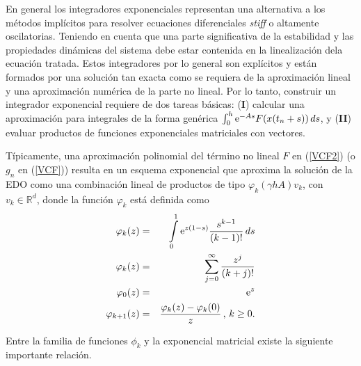 En general los integradores exponenciales representan una alternativa a los métodos implícitos para resolver ecuaciones diferenciales \textit{stiff} o altamente oscilatorias. Teniendo en cuenta que una parte significativa de la estabilidad y las propiedades dinámicas del sistema debe estar contenida en la linealización dela ecuación tratada. Estos integradores por lo general son explícitos y están formados por una solución tan exacta como se requiera de la aproximación lineal y una aproximación numérica de la parte no lineal. Por lo tanto, construir un integrador exponencial requiere de dos tareas básicas: (\textbf{I}) calcular una aproximación para integrales de la forma 
genérica $\int_{0}^{h} \mathrm{e}^{-As}F(x(t_n+s)) \,ds$, y (\textbf{II}) evaluar productos de funciones exponenciales matriciales con vectores.

Típicamente, una aproximación polinomial del término no lineal $F$ en (\ref{VCF2}) (o $g_n$ en (\ref{VCF})) resulta en un esquema
exponencial que aproxima la solución de la EDO como una combinación lineal de productos de tipo $\varphi_k(\gamma hA)v_k$, con 
$v_k\in \mathbb{R}^{d}$, donde la función $\varphi_k$ está definida como
\begin{eqnarray}\label{phi-definition}
    \varphi_k(z) & = &\int\limits_{0}^{1}\mathrm{e}^{z(1-s)}\frac{s^{k-1}}{(k-1)!}\,ds \nonumber \\
    \varphi_k(z) & = &\sum\limits_{j=0}^{\infty}\frac{z^{j}}{(k+j)!}\label{DEF-PHI}\\
    \varphi_0(z) &=& \mathrm{e}^{z} \nonumber\\
    \varphi_{k+1}(z) &=& \frac{\varphi_k(z)-\varphi_k(0)}{z}\,,\,k\geq0. \nonumber
\end{eqnarray}

Entre la familia de funciones $\phi_k$ y la exponencial matricial existe la siguiente importante relación.

